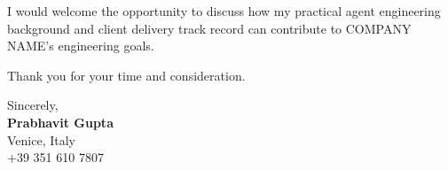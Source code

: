 \documentclass[a4paper,11pt]{article}
\begin{document}
I would welcome the opportunity to discuss how my practical agent engineering background and client delivery track record can contribute to COMPANY NAME's engineering goals.

Thank you for your time and consideration.

\vspace{12pt}
\noindent Sincerely,\\[4pt]
\textbf{Prabhavit Gupta}\\
Venice, Italy\\
+39 351 610 7807
\end{document}
